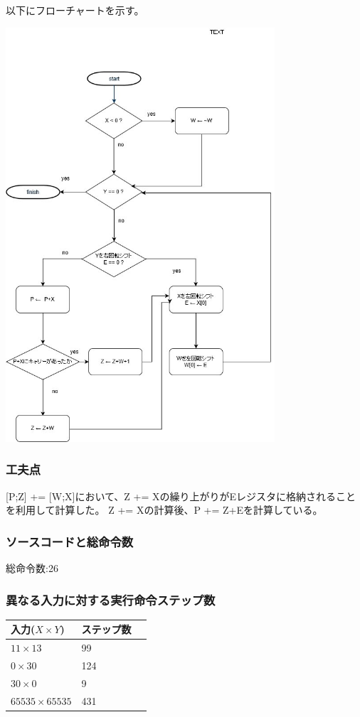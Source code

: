 \documentclass[dvipdfmx,12pt]{jreport}
\begin{document}
以下にフローチャートを示す。

\includegraphics[width=10cm,bb=0 0 604 932]{report1_1_nakata.jpg}


\subsubsection{工夫点}
[P;Z] += [W;X]において、Z += Xの繰り上がりがEレジスタに格納されることを利用して計算した。
Z += Xの計算後、P += Z+Eを計算している。


\subsubsection{ソースコードと総命令数}

総命令数:26

\subsubsection{異なる入力に対する実行命令ステップ数}
\begin{table}[h]
  \begin{tabular}{|l|l|l|} \hline
    入力($X \times Y$) & ステップ数 \\ \hline
    $11 \times 13$ & 99 \\ \hline
    $0 \times 30$ & 124 \\ \hline
    $30 \times 0$ & 9 \\ \hline
    $65535 \times 65535$ & 431 \\ \hline
  \end{tabular}
\end{table}
\end{document}
